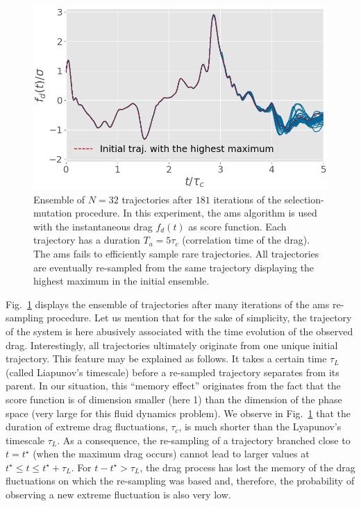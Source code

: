 \documentclass[pre,aps,floatfix,10pt,superscriptaddress, notitlepage,preprint]{revtex4-1}
\begin{document}
\begin{figure}
  \centering
  \includegraphics[width=.7\linewidth]{AMS_drag_trajectories/AMS_drag_trajectories.png}
  \caption{\label{fig:AMS_drag_trajectories} Ensemble of $N = 32$ trajectories after $181$ iterations of the selection-mutation procedure. In this experiment, the \ac{ams} algorithm is used with the instantaneous drag $f_d(t)$ as score function. Each trajectory has a duration $T_a = 5\tau_c$ (correlation time of the drag).
  The \ac{ams} fails to efficiently sample rare trajectories. All trajectories are eventually re-sampled from the same trajectory displaying the highest maximum in the initial ensemble.}
\end{figure}

%
Fig.~\ref{fig:AMS_drag_trajectories} displays the ensemble of trajectories after many iterations of the \ac{ams} re-sampling procedure. 
%
Let us mention that for the sake of simplicity, the trajectory of the system is here abusively associated with the time evolution of the observed drag.  
%
Interestingly, all trajectories ultimately originate from one unique initial trajectory. 
%
This feature may be explained as follows.
It takes a certain time $\tau_L$ (called Liapunov's timescale) before a re-sampled trajectory separates from its parent. In our situation, this ``memory effect'' originates from the fact that the score function is of dimension smaller (here 1) than the dimension of the phase space (very large for this fluid dynamics problem). 
%
We observe in Fig.~\ref{fig:AMS_drag_trajectories} that the duration of extreme drag fluctuations, $\tau_c$, is much shorter than the Lyapunov's timescale $\tau_L$.
As a consequence, the re-sampling of a trajectory branched close to $t=t^{\star}$ (when the maximum drag occurs) cannot lead to larger values at $t^{\star} \leq t \leq t^{\star}+\tau_L$.
For $t - t^{\star} >\tau_L$, the drag process has lost the memory of the drag fluctuations on which the re-sampling was based and, therefore, the probability of observing a new extreme fluctuation is also very low.
%
\end{document}
